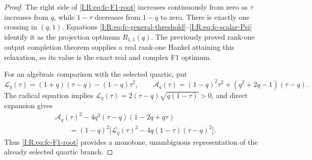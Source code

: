 \begin{proof}
The right side of \eqref{I:R:eq:fc-F1-root} increases continuously from zero as
$\tau$ increases from $q$, while $1-\tau$ decreases from $1-q$ to zero.
There is exactly one crossing in $(q,1)$. Equations
\eqref{I:R:eq:fc-general-threshold}--\eqref{I:R:eq:fc-scalar-Psi} identify it as the
projection optimum $R_{1,1}(q)$. The previously proved rank-one output
completion theorem supplies a real rank-one Hankel attaining this relaxation,
so its value is the exact real and complex F1 optimum.

For an algebraic comparison with the selected quartic, put
\[
 \mathcal L_q(\tau)=(1+q)(\tau-q)-(1-q)\tau^2,\qquad
 \mathcal A_q(\tau)=(1-q)^2\tau^2+(q^2+2q-1)(\tau-q).
\]
The radical equation implies
$\mathcal L_q(\tau)=2(\tau-q)\sqrt{q(1-\tau)}>0$, and direct expansion gives
\begin{align*}
 &\mathcal A_q(\tau)^2-4q^3(\tau-q)(1-2q+q\tau)\\
 &\qquad=(1-q)^2\bigl[\mathcal L_q(\tau)^2
                        -4q(1-\tau)(\tau-q)^2\bigr].
\end{align*}
Thus \eqref{I:R:eq:fc-F1-root} provides a monotone, unambiguous representation of
the already selected quartic branch.
\end{proof}

